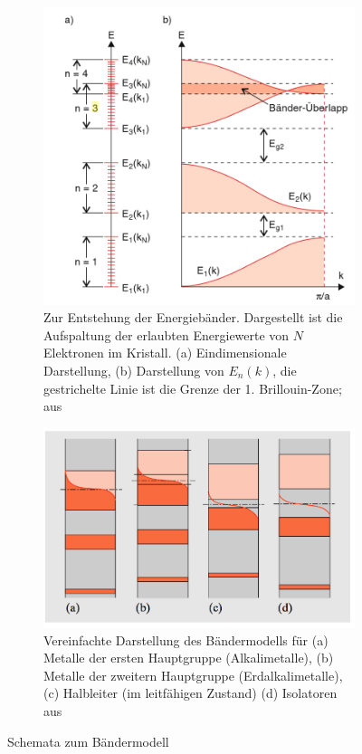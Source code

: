 \begin{figure}
    \centering
    \begin{subfigure}[b]{\picwidththeo}
        \includegraphics[width=\textwidth]{pics/baender1}
        \caption{Zur Entstehung der Energiebänder. Dargestellt ist die Aufspaltung der erlaubten 
Energiewerte von $N$ Elektronen im Kristall. 
(a) Eindimensionale Darstellung, 
(b) Darstellung von $E_n(k)$, die gestrichelte Linie ist die Grenze der 1. Brillouin-Zone;
aus \cite{demtroder2000experimentalphysik}}
        \label{fig:baender1}
    \end{subfigure}\qquad
    \begin{subfigure}[b]{\picwidththeo}
        \includegraphics[width=\textwidth]{pics/baender2}
        \caption{Vereinfachte Darstellung des Bändermodells für 
(a) Metalle der ersten Hauptgruppe (Alkalimetalle), 
(b) Metalle der zweitern Hauptgruppe (Erdalkalimetalle), 
(c) Halbleiter (im leitfähigen Zustand)
(d) Isolatoren
aus \cite{vogel1997gerthsen}}
        \label{fig:baender2}
    \end{subfigure}
    \caption{Schemata zum Bändermodell}
    \label{fig:baender}
\end{figure}
